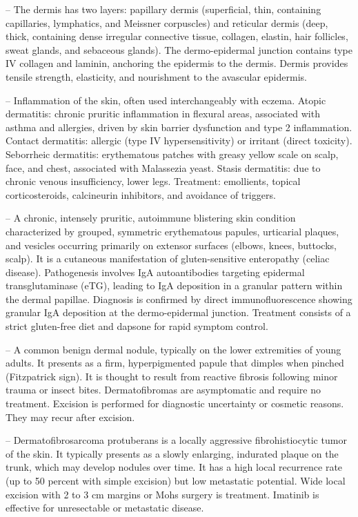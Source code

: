 -- The dermis has two layers: papillary dermis (superficial, thin, containing capillaries, lymphatics, and Meissner corpuscles) and reticular dermis (deep, thick, containing dense irregular connective tissue, collagen, elastin, hair follicles, sweat glands, and sebaceous glands). The dermo-epidermal junction contains type IV collagen and laminin, anchoring the epidermis to the dermis. Dermis provides tensile strength, elasticity, and nourishment to the avascular epidermis.

-- Inflammation of the skin, often used interchangeably with eczema. Atopic dermatitis: chronic pruritic inflammation in flexural areas, associated with asthma and allergies, driven by skin barrier dysfunction and type 2 inflammation. Contact dermatitis: allergic (type IV hypersensitivity) or irritant (direct toxicity). Seborrheic dermatitis: erythematous patches with greasy yellow scale on scalp, face, and chest, associated with Malassezia yeast. Stasis dermatitis: due to chronic venous insufficiency, lower legs. Treatment: emollients, topical corticosteroids, calcineurin inhibitors, and avoidance of triggers.

-- A chronic, intensely pruritic, autoimmune blistering skin condition characterized by grouped, symmetric erythematous papules, urticarial plaques, and vesicles occurring primarily on extensor surfaces (elbows, knees, buttocks, scalp). It is a cutaneous manifestation of gluten-sensitive enteropathy (celiac disease). Pathogenesis involves IgA autoantibodies targeting epidermal transglutaminase (eTG), leading to IgA deposition in a granular pattern within the dermal papillae. Diagnosis is confirmed by direct immunofluorescence showing granular IgA deposition at the dermo-epidermal junction. Treatment consists of a strict gluten-free diet and dapsone for rapid symptom control.

-- A common benign dermal nodule, typically on the lower extremities of young adults. It presents as a firm, hyperpigmented papule that dimples when pinched (Fitzpatrick sign). It is thought to result from reactive fibrosis following minor trauma or insect bites. Dermatofibromas are asymptomatic and require no treatment. Excision is performed for diagnostic uncertainty or cosmetic reasons. They may recur after excision.

-- Dermatofibrosarcoma protuberans is a locally aggressive fibrohistiocytic tumor of the skin. It typically presents as a slowly enlarging, indurated plaque on the trunk, which may develop nodules over time. It has a high local recurrence rate (up to 50 percent with simple excision) but low metastatic potential. Wide local excision with 2 to 3 cm margins or Mohs surgery is treatment. Imatinib is effective for unresectable or metastatic disease.

